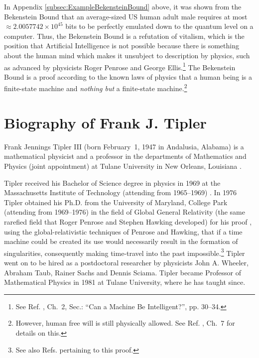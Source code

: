 \documentclass[letterpaper,12pt]{article}
\begin{document}
In Appendix \ref{subsec:ExampleBekensteinBound} above, it was shown from the Bekenstein Bound that an average-sized US human adult male requires at most \( \approx 2.0057742\times 10^{45} \) bits to be perfectly emulated down to the quantum level on a computer. Thus, the Bekenstein Bound is a refutation of vitalism, which is the position that Artificial Intelligence is not possible because there is something about the human mind which makes it unsubject to description by physics, such as advanced by physicists Roger Penrose and George Ellis.\footnote{See Ref. , Ch.~2, Sec.: ``Can a Machine Be Intelligent?'', pp. 30--34.} The Bekenstein Bound is a proof according to the known laws of physics that a human being is a finite-state machine and \emph{nothing but} a finite-state machine.\footnote{However, human free will is still physically allowed. See Ref. , Ch.~7 for details on this.}

\section{Biography of Frank J. Tipler}
\label{sec:BiographyFrankTipler}

Frank Jennings Tipler III (born February~1, 1947 in Andalusia, Alabama) \cite{Peacock1998} is a mathematical physicist and a professor in the departments of Mathematics and Physics (joint appointment) at Tulane University in New Orleans, Louisiana \cite{Tipler2007b}.

Tipler received his Bachelor of Science degree in physics \cite{Tipler1969} in 1969 at the Massachusetts Institute of Technology (attending from 1965--1969) \cite{Tipler2007b}. In 1976 Tipler obtained his Ph.D. from the University of Maryland, College Park (attending from 1969--1976) in the field of Global General Relativity (the same rarefied field that Roger Penrose and Stephen Hawking developed) for his proof \cite{Tipler1976}, using the global-relativistic techniques of Penrose and Hawking, that if a time machine could be created its use would necessarily result in the formation of singularities, consequently making time-travel into the past impossible.\footnote{See also Refs.  pertaining to this proof.} Tipler went on to be hired as a postdoctoral researcher by physicists John A. Wheeler, Abraham Taub, Rainer Sachs and Dennis Sciama. Tipler became Professor of Mathematical Physics in 1981 at Tulane University, where he has taught since.
\end{document}
